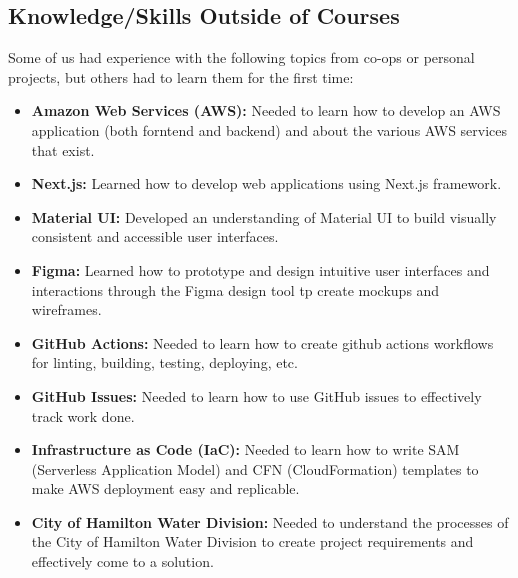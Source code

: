 \documentclass{article}
\begin{document}
\subsection{Knowledge/Skills Outside of Courses}
Some of us had experience with the following topics from co-ops or
personal projects, but others had to learn them for the first time:
\begin{itemize}
  \item \textbf{Amazon Web Services (AWS):} Needed to learn how to
    develop an AWS
    application (both forntend and backend) and about the various AWS
    services that exist.
  \item \textbf{Next.js:} Learned how to develop web applications
    using Next.js framework.
  \item \textbf{Material UI:} Developed an understanding of Material
    UI to build visually consistent and accessible user interfaces.
  \item \textbf{Figma:} Learned how to prototype and design intuitive
    user interfaces and interactions through the Figma design tool tp
    create mockups and wireframes.
  \item \textbf{GitHub Actions:} Needed to learn how to create github actions
    workflows for linting, building, testing, deploying, etc.
  \item \textbf{GitHub Issues:} Needed to learn how to use GitHub issues to
    effectively track work done.
  \item \textbf{Infrastructure as Code (IaC):} Needed to learn how to write SAM
    (Serverless Application Model) and CFN (CloudFormation) templates to
    make AWS deployment easy and replicable.
  \item \textbf{City of Hamilton Water Division:} Needed to understand the
    processes of the City of Hamilton Water Division to create
    project requirements and effectively come to a solution.
\end{itemize}
\end{document}
